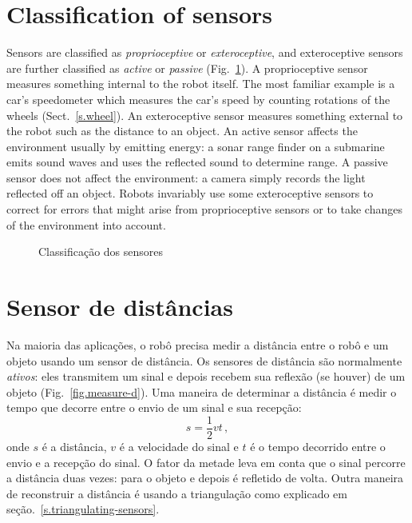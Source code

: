 \section{Classification of sensors}\label{s.classify}

Sensors are classified as \emph{proprioceptive} or \emph{exteroceptive}, and exteroceptive sensors are further classified as \emph{active} or \emph{passive} (Fig.~\ref{fig.sensor-classification}). A proprioceptive sensor measures something internal to the robot itself. The most familiar example is a car's speedometer which measures the car's speed by counting rotations of the wheels (Sect.~\ref{s.wheel}). An exteroceptive sensor measures something external to the robot such as the distance to an object. An active sensor affects the environment usually by emitting energy: a sonar range finder on a submarine emits sound waves and uses the reflected sound to determine range. A passive sensor does not affect the environment: a camera simply records the light reflected off an object. Robots invariably use some exteroceptive sensors to correct for errors that might arise from proprioceptive sensors or to take changes of the environment into account.

\begin{figure}
\begin{center}
\caption{Classificação dos sensores}\label{fig.sensor-classification}
\end{center}
\end{figure}

\section{Sensor de distâncias}\label{s.distance-sensors}

Na maioria das aplicações, o robô precisa medir a distância entre o robô e um objeto usando um sensor de distância. Os sensores de distância são normalmente \emph{ativos}: eles transmitem um sinal e depois recebem sua reflexão (se houver) de um objeto (Fig.~\ref{fig.measure-d}). Uma maneira de determinar a distância é medir o tempo que decorre entre o envio de um sinal e sua recepção:
\begin{equation}
s = \frac{1}{2}vt\,,\label{eq.reflected}
\end{equation}
onde $s$ é a distância, $v$ é a velocidade do sinal e $t$ é o tempo decorrido entre o envio e a recepção do sinal. O fator da metade leva em conta que o sinal percorre a distância duas vezes: para o objeto e depois é refletido de volta. Outra maneira de reconstruir a distância é usando a triangulação como explicado em seção.~\ref{s.triangulating-sensors}.

